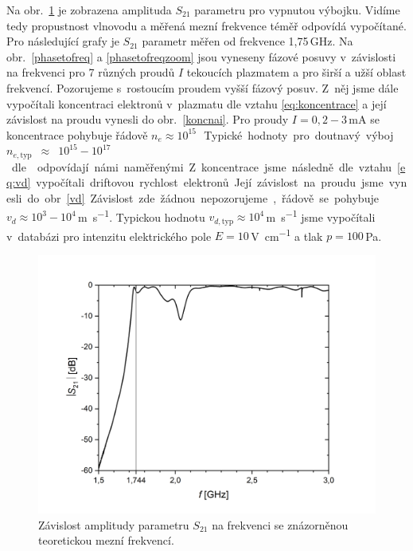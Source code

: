 \documentclass[a4paper,12pt]{article}
\begin{document}
Na obr.~\ref{S21vyp} je zobrazena 
amplituda $S_{21}$ parametru pro vypnutou výbojku. Vidíme tedy propustnost 
vlnovodu a měřená mezní frekvence téměř odpovídá vypočítané. Pro následující 
grafy je $S_{21}$ parametr měřen od frekvence 1,75\,\si{\giga\hertz}. Na 
obr.~\ref{phasetofreq} a \ref{phasetofreqzoom} jsou vyneseny fázové posuvy
v~závislosti na frekvenci pro 7 různých proudů $I$ tekoucích plazmatem a pro 
širší a užší oblast frekvencí. Pozorujeme s~rostoucím proudem vyšší fázový 
posuv. Z~něj jsme dále vypočítali koncentraci elektronů v~plazmatu dle vztahu 
\eqref{eq:koncentrace} a její závislost na proudu vynesli do 
obr.~\ref{koncnai}. Pro proudy $I=0,2\!-\!3$\,\si{\milli\ampere} se 
koncentrace 
pohybuje řádově $n_e \approx 10^{15}$\,\si{\cubic\per\meter}. 
Typické 
hodnoty pro doutnavý výboj
$n_{e,\text{typ}}$~$\approx$~$10^{15}\!-\!10^{17}$\,\si{\cubic\per\meter} dle
\cite{conc} odpovídají námi naměřenými. Z~koncentrace jsme následně dle vztahu 
\eqref{eq:vd} vypočítali driftovou rychlost elektronů. Její závislost na proudu 
jsme vynesli do obr.~\ref{vd}. Závislost zde žádnou nepozorujeme, řádově se 
pohybuje $v_d \approx 10^3\!-\!10^4$\,\si{\meter\per\second}. Typickou hodnotu 
$v_{d,\text{typ}} \approx 10^4$\,\si{\meter\per\second} jsme vypočítali 
v~databázi \cite{lxcat} pro intenzitu elektrického pole $E = 
10$\,\si{\volt\per\centi\meter} a tlak $p = 100$\,\si{\pascal}.


\begin{figure}[h]
	\centering
	\includegraphics[width=0.9\linewidth]{S21vyp.png}
	\caption{Závislost amplitudy parametru $S_{21}$ na frekvenci se znázorněnou 
	teoretickou mezní frekvencí.}
	\label{S21vyp}
\end{figure}
\end{document}
